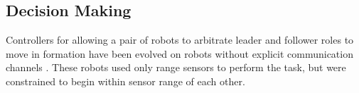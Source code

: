 \documentclass[]{article}
\begin{document}
\subsection{Decision Making}

Controllers for allowing a pair of robots to arbitrate leader and follower roles to move in formation have been evolved on robots without explicit communication channels \cite{quinn2001evolving, quinn2003evolving}. 
These robots used only range sensors to perform the task, but were constrained to begin within sensor range of each other. 

%
%
%
\end{document}
